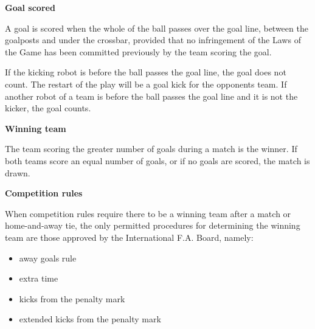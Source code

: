 \clearpage
\sffamily
{\bfseries\color[rgb]{0.4,0.4,0.4}{Law 10 -- The Method of Scoring} }
{}

\bigskip

{\bfseries Goal scored }

\headlinebox

A goal is scored when the whole of the ball passes over the goal line,
between the goalposts and under the crossbar,
provided that no infringement of the Laws of the Game has been committed
previously by the team scoring the goal.

\bigskip

If the kicking robot is   before the ball passes the goal line,
 the goal does not count.
The restart of the play will be a goal kick for the opponents team.
If another robot of a team is   before the ball
passes the goal line and it is not the kicker,  the goal counts.

\bigskip

{\bfseries Winning team}

\headlinebox

The team scoring the greater number of goals during a match is the winner. If both teams score an equal number of goals, or if no goals are scored, the match is drawn. 

\bigskip

{\bfseries Competition rules }

\headlinebox

When competition rules require there to be a winning team after a match or home-and-away tie, the only permitted procedures for determining the winning team are those approved by the International F.A. Board, namely:

\begin{itemize}
\item away goals rule
\item extra time
\item kicks from the penalty mark
\item {}extended kicks from the penalty mark
\end{itemize}


{\bfseries {}}

\removed{\headlinebox}

